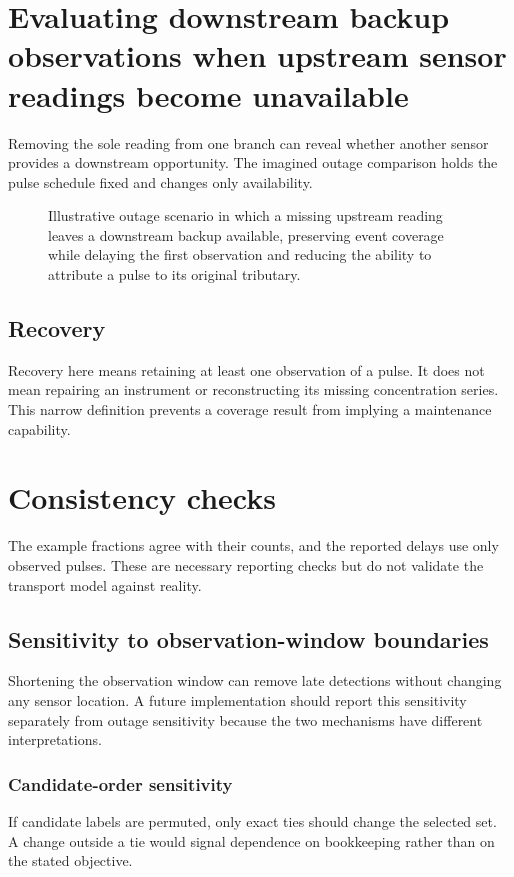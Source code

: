 \section{Evaluating downstream backup observations when upstream sensor readings become unavailable}\label{demo-evaluation-outages}
Removing the sole reading from one branch can reveal whether another sensor provides a downstream opportunity. The imagined outage comparison holds the pulse schedule fixed and changes only availability.
\begin{figure}[htbp]
\centering
{}
\caption{Illustrative outage scenario in which a missing upstream reading leaves a downstream backup available, preserving event coverage while delaying the first observation and reducing the ability to attribute a pulse to its original tributary.}\label{demo-fig-outages}
\end{figure}
\subsection{Recovery}\label{demo-evaluation-recovery}
Recovery here means retaining at least one observation of a pulse. It does not mean repairing an instrument or reconstructing its missing concentration series. This narrow definition prevents a coverage result from implying a maintenance capability.
\section{Consistency checks}\label{demo-evaluation-checks}
The example fractions agree with their counts, and the reported delays use only observed pulses. These are necessary reporting checks but do not validate the transport model against reality.
\subsection{Sensitivity to observation-window boundaries}\label{demo-evaluation-sensitivity}
Shortening the observation window can remove late detections without changing any sensor location. A future implementation should report this sensitivity separately from outage sensitivity because the two mechanisms have different interpretations.
\subsubsection{Candidate-order sensitivity}\label{demo-evaluation-order}
If candidate labels are permuted, only exact ties should change the selected set. A change outside a tie would signal dependence on bookkeeping rather than on the stated objective.
